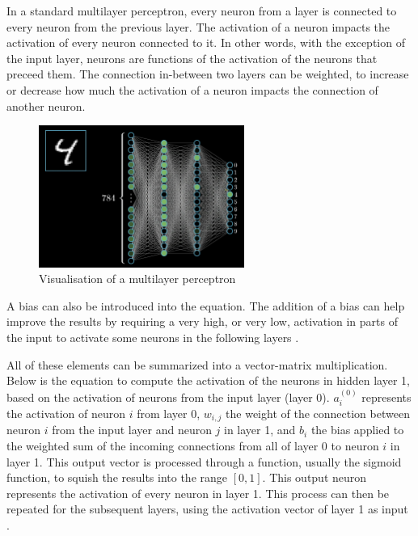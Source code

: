 \documentclass[12pt,a4paper,notitlepage]{article}
\begin{document}
In a standard multilayer perceptron, every neuron from a layer is connected to every neuron from the previous layer. The activation of a neuron impacts the activation of every neuron connected to it. In other words, with the exception of the input layer, neurons are functions of the activation of the neurons that preceed them. The connection in-between two layers can be weighted, to increase or decrease how much the activation of a neuron impacts the connection of another neuron.

\begin{figure}[htbp]
	\centering
		\includegraphics[width=0.60\textwidth]{images/perceptron-visualisation.png}
	\caption{Visualisation of a multilayer perceptron \cite{sanderson_gradient_2017}}
	\label{fig:perceptron-visualisation}
\end{figure}

A bias can also be introduced into the equation. The addition of a bias can help improve the results by requiring a very high, or very low, activation in parts of the input to activate some neurons in the following layers \cite{sanderson_but_2017}.

All of these elements can be summarized into a vector-matrix multiplication. Below is the equation to compute the activation of the neurons in hidden layer 1, based on the activation of neurons from the input layer (layer 0). \(a_i^{(0)}\) represents the activation of neuron \(i\) from layer 0, \(w_{i,j}\) the weight of the connection between neuron \(i\) from the input layer and neuron \(j\) in layer 1, and \(b_i\) the bias applied to the weighted sum of the incoming connections from all of layer 0 to neuron \(i\) in layer 1. This output vector is processed through a function, usually the sigmoid function, to squish the results into the range \([0,1]\). This output neuron represents the activation of every neuron in layer 1. This process can then be repeated for the subsequent layers, using the activation vector of layer 1 as input \cite{sanderson_but_2017}.
\end{document}

